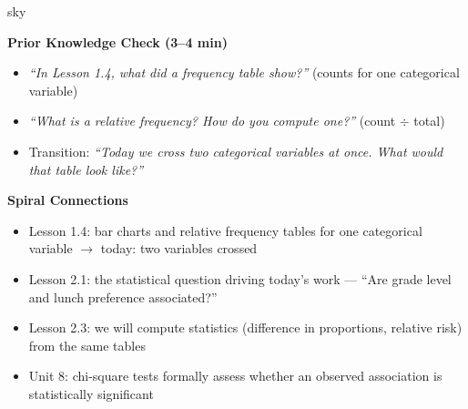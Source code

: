 \documentclass[10pt]{article}
\begin{document}
\begin{skillbox}{sky}
\begin{minipage}[t]{0.48\linewidth}
    \textbf{Prior Knowledge Check (3--4 min)}
    \begin{itemize}
        \item \textit{``In Lesson 1.4, what did a frequency table show?''} (counts for
              one categorical variable)
        \item \textit{``What is a relative frequency? How do you compute one?''}
              (count $\div$ total)
        \item Transition: \textit{``Today we cross two categorical variables at once.
              What would that table look like?''}
    \end{itemize}
\end{minipage}
\hfill
\begin{minipage}[t]{0.48\linewidth}
    \textbf{Spiral Connections}
    \begin{itemize}
        \item Lesson 1.4: bar charts and relative frequency tables for one categorical
              variable $\to$ today: two variables crossed
        \item Lesson 2.1: the statistical question driving today's work --- ``Are grade
              level and lunch preference associated?''
        \item Lesson 2.3: we will compute statistics (difference in proportions,
              relative risk) from the same tables
        \item Unit 8: chi-square tests formally assess whether an observed association
              is statistically significant
    \end{itemize}
\end{minipage}
\end{skillbox}
\end{document}
